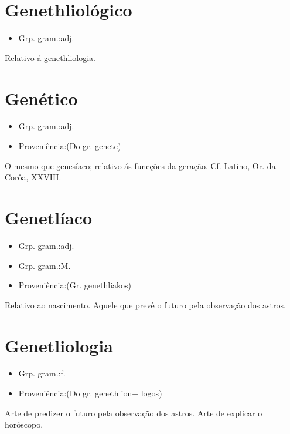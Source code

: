 \section{Genethliológico}
\begin{itemize}
\item {Grp. gram.:adj.}
\end{itemize}
Relativo á genethliologia.
\section{Genético}
\begin{itemize}
\item {Grp. gram.:adj.}
\end{itemize}
\begin{itemize}
\item {Proveniência:(Do gr. \textunderscore genete\textunderscore )}
\end{itemize}
O mesmo que \textunderscore genesíaco\textunderscore ; relativo ás funcções da geração. Cf. Latino, \textunderscore Or. da Corôa\textunderscore , XXVIII.
\section{Genetlíaco}
\begin{itemize}
\item {Grp. gram.:adj.}
\end{itemize}
\begin{itemize}
\item {Grp. gram.:M.}
\end{itemize}
\begin{itemize}
\item {Proveniência:(Gr. \textunderscore genethliakos\textunderscore )}
\end{itemize}
Relativo ao nascimento.
Aquele que prevê o futuro pela observação dos astros.
\section{Genetliologia}
\begin{itemize}
\item {Grp. gram.:f.}
\end{itemize}
\begin{itemize}
\item {Proveniência:(Do gr. \textunderscore genethlion\textunderscore  + \textunderscore logos\textunderscore )}
\end{itemize}
Arte de predizer o futuro pela observação dos astros.
Arte de explicar o horóscopo.
